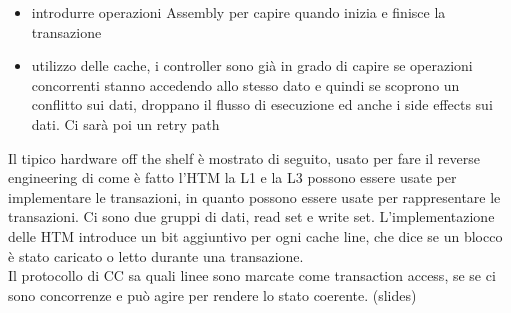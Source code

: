 \documentclass[12pt, oneside]{extbook} %
\begin{document}
\begin{itemize}
\item introdurre operazioni Assembly per capire quando inizia e finisce la transazione
\item utilizzo delle cache, i controller sono già in grado di capire se operazioni concorrenti stanno accedendo allo stesso dato e quindi se scoprono un conflitto sui dati, droppano il flusso di esecuzione ed anche i side effects sui dati. Ci sarà poi un retry path
\end{itemize}
Il tipico hardware off the shelf è mostrato di seguito, usato per fare il reverse engineering di come è fatto l'HTM
la L1 e la L3 possono essere usate per implementare le transazioni, in quanto possono essere usate per rappresentare le transazioni. Ci sono due gruppi di dati, read set e write set. L'implementazione delle HTM introduce un bit aggiuntivo per ogni cache line, che dice se un blocco è stato caricato o letto durante una transazione.\\ Il protocollo di CC sa quali linee sono marcate come transaction access, se se ci sono concorrenze e può agire per rendere lo stato coerente. (slides)
\end{document}
